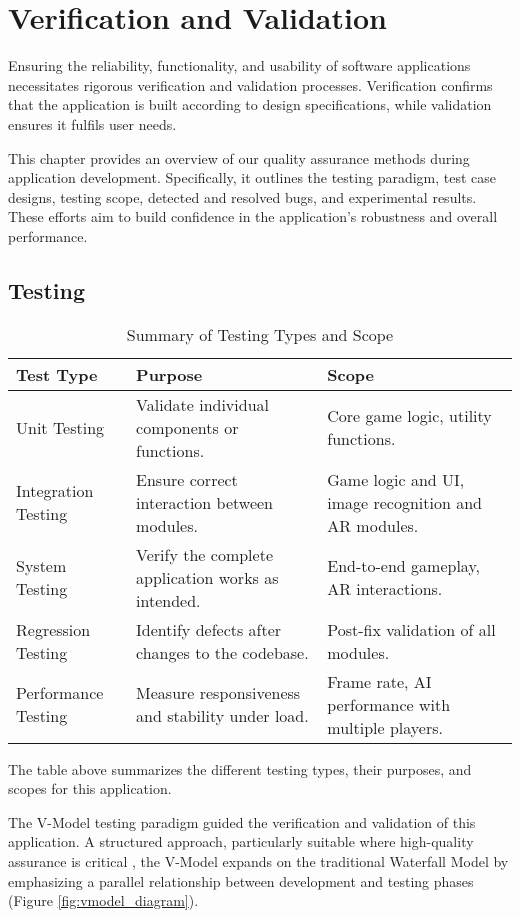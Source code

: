 \chapter{Verification and Validation}

Ensuring the reliability, functionality, and usability of software applications necessitates rigorous verification and validation processes. Verification confirms that the application is built according to design specifications, while validation ensures it fulfils user needs.

This chapter provides an overview of our quality assurance methods during application development. Specifically, it outlines the testing paradigm, test case designs, testing scope, detected and resolved bugs, and experimental results. These efforts aim to build confidence in the application's robustness and overall performance.

\section{Testing}
\begin{table}[ht!]
    \centering
    \begin{tabular}{|p{4cm}|p{4cm}|p{4cm}|}
    \hline
    \textbf{Test Type} & \textbf{Purpose} & \textbf{Scope} \\ \hline
    Unit Testing       & Validate individual components or functions. & Core game logic, utility functions. \\ \hline
    Integration Testing & Ensure correct interaction between modules. & Game logic and UI, image recognition and AR modules. \\ \hline
    System Testing     & Verify the complete application works as intended. & End-to-end gameplay, AR interactions. \\ \hline
    Regression Testing & Identify defects after changes to the codebase. & Post-fix validation of all modules. \\ \hline
    Performance Testing & Measure responsiveness and stability under load. & Frame rate, AI performance with multiple players. \\ \hline
    \end{tabular}
    \caption{Summary of Testing Types and Scope}
    \label{tab:testing_summary}
\end{table}
The table above summarizes the different testing types, their purposes, and scopes for this application.

The V-Model testing paradigm guided the verification and validation of this application. A structured approach, particularly suitable where high-quality assurance is critical \cite{bib:vmodel}, the V-Model expands on the traditional Waterfall Model by emphasizing a parallel relationship between development and testing phases (Figure \ref{fig:vmodel_diagram}). 

